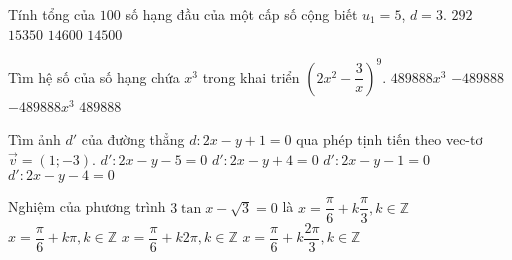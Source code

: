 \begin{ex}%
	Tính tổng của $ 100 $ số hạng đầu của một cấp số cộng biết $ u_1=5 $, $ d=3 $. 
	\choice
	{$ 292 $}
	{\True $ 15350 $}
	{$ 14600 $}
	{$ 14500 $}
\end{ex}
\begin{ex}%
	 Tìm hệ số của số hạng chứa $ x^3 $ trong khai triển $ \left(2x^2-\dfrac{3}{x}\right)^9 $.
	\choice
	{$ 489888x^3 $}
	{\True $ -489888 $}
	{$ -489888x^3 $}
	{$ 489888 $}
\end{ex}
\begin{ex}%
	Tìm ảnh $ d' $ của đường thẳng $ d\colon 2x-y+1=0 $ qua phép tịnh tiến theo vec-tơ $ \overrightarrow{v}=(1;-3) $.
	\choice
	{$ d'\colon 2x-y-5=0 $}
	{$ d'\colon 2x-y+4=0 $}
	{$ d'\colon 2x-y-1=0 $}
	{\True $ d'\colon 2x-y-4=0 $}
\end{ex}
\begin{ex}%
	 Nghiệm của phương trình $ 3\tan x-\sqrt{3}=0 $ là
	\choice
	{$ x=\dfrac{\pi}{6}+k\dfrac{\pi}{3},k\in\mathbb{Z} $}
	{\True $ x=\dfrac{\pi}{6}+k\pi,k\in\mathbb{Z} $}
	{$ x=\dfrac{\pi}{6}+k2\pi,k\in\mathbb{Z} $}
	{$ x=\dfrac{\pi}{6}+k\dfrac{2\pi}{3},k\in\mathbb{Z} $}
\end{ex}
